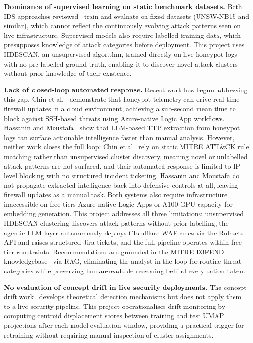 \documentclass[12pt, a4paper]{report}   %
\begin{document}
\textbf{Dominance of supervised learning on static benchmark datasets.}
Both IDS approaches reviewed~\cite{eos-ids,rana2024} train and evaluate on fixed
datasets (UNSW-NB15 and similar), which cannot reflect the continuously evolving
attack patterns seen on live infrastructure. Supervised models also require labelled
training data, which presupposes knowledge of attack categories before deployment.
This project uses HDBSCAN, an unsupervised algorithm, trained directly on live
honeypot logs with no pre-labelled ground truth, enabling it to discover novel attack
clusters without prior knowledge of their existence.

\textbf{Lack of closed-loop automated response.}
Recent work has begun addressing this gap. Chin et al.~\cite{chin2025} demonstrate
that honeypot telemetry can drive real-time firewall updates in a cloud environment,
achieving a sub-second mean time to block against SSH-based threats using
Azure-native Logic App workflows. Hassanin and Moustafa~\cite{hassanin2024} show
that LLM-based TTP extraction from honeypot logs can surface actionable intelligence
faster than manual analysis. However, neither work closes the full loop: Chin
et al.\ rely on static MITRE ATT\&CK rule matching rather than unsupervised cluster
discovery, meaning novel or unlabelled attack patterns are not surfaced, and their
automated response is limited to IP-level blocking with no structured incident
ticketing. Hassanin and Moustafa do not propagate extracted intelligence back into
defensive controls at all, leaving firewall updates as a manual task. Both systems
also require infrastructure inaccessible on free tiers Azure-native Logic Apps
or A100 GPU capacity for embedding generation. This project addresses all three
limitations: unsupervised HDBSCAN clustering discovers attack patterns without prior
labelling, the agentic LLM layer autonomously deploys Cloudflare WAF rules via the
Rulesets API and raises structured Jira tickets, and the full pipeline operates
within free-tier constraints. Recommendations are grounded in the MITRE
D3FEND knowledgebase~\cite{d3fend} via RAG, eliminating the analyst in the loop
for routine threat categories while preserving human-readable reasoning behind
every action taken.

\textbf{No evaluation of concept drift in live security deployments.}
The concept drift work~\cite{concept-drift} develops theoretical detection mechanisms
but does not apply them to a live security pipeline. This project operationalises
drift monitoring by computing centroid displacement scores between training and test
UMAP projections after each model evaluation window, providing a practical trigger
for retraining without requiring manual inspection of cluster assignments.
\end{document}

